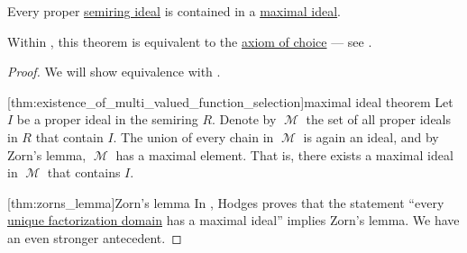 \begin{theorem}\label{thm:maximal_ideal_theorem}
  Every proper \hyperref[def:semiring_ideal]{semiring ideal} is contained in a \hyperref[def:semiring_ideal/maximal]{maximal ideal}.

  Within \hyperref[def:zfc]{}, this theorem is equivalent to the \hyperref[def:zfc/choice]{axiom of choice} --- see .
\end{theorem}
\begin{proof}
  We will show equivalence with .

  [thm:existence_of_multi_valued_function_selection]{maximal ideal theorem} Let \( I \) be a proper ideal in the semiring \( R \). Denote by \( \mscrM \) the set of all proper ideals in \( R \) that contain \( I \). The union of every chain in \( \mscrM \) is again an ideal, and by Zorn's lemma, \( \mscrM \) has a maximal element. That is, there exists a maximal ideal in \( \mscrM \) that contains \( I \).

  [thm:zorns_lemma]{Zorn's lemma} In \cite{Hodges1979}, Hodges proves that the statement \enquote{every \hyperref[def:unique_factorization_domain]{unique factorization domain} has a maximal ideal} implies Zorn's lemma. We have an even stronger antecedent.
\end{proof}
